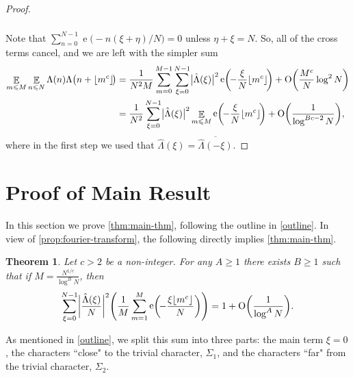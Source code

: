 \documentclass[letterpaper, 12pt]{article}
\theoremstyle{plain}
\newtheorem{Theorem}{Theorem}
\theoremstyle{definition}
\theoremstyle{plain}
\theoremstyle{plain}
\numberwithin{equation}{section}
\newcommand{\Oh}{{\rm O}}
\renewcommand{\leq}{\leqslant}
\renewcommand{\geq}{\geqslant}
\newcommand{\E}{\mathbb{E}}
\newcommand{\1}{\textbf{1}}
\DeclarePairedDelimiter\floor{\lfloor}{\rfloor}
\DeclareMathOperator{\e}{e}
\begin{document}
\begin{proof}
\begin{align*}
\begin{split}
        \end{split}
    \end{align*}
    Note that \(\sum_{n = 0}^{N - 1} \e\bigl(-n(\xi + \eta)/N \bigr) = 0\) unless \(\eta +\xi = N\). So, all of the cross terms cancel, and we are left with the simpler sum
    \begin{align*}
        \mathop{\E}_{m \leq M} \mathop{\E}_{n \leq N} \Lambda(n) \Lambda\bigl(n + \floor{m^c} \!\bigr)
        &= \frac{1}{N^2M} \sum_{m = 0}^{M - 1} \sum_{\xi = 0}^{N - 1} \bigl\lvert \hat{\Lambda}(\xi) \bigr\rvert^2 \e\biggl(\! -\frac{\xi}{N} \floor{m^c} \!\biggr) + \Oh \biggl(\frac{M^c}{N}\log^2{N} \biggr)\\
        &=\frac{1}{N^2} \sum_{\xi = 0}^{N - 1} \bigl\lvert \hat{\Lambda}(\xi) \bigr\rvert^2 \mathop{\E}_{m \leq M} \e\biggl(\! -\frac{\xi}{N} \floor{m^c} \!\biggr) + \Oh \biggl(\frac{1}{\log^{Bc-2}{N}}\biggr),
    \end{align*} where in the first step we used that $\hat{\Lambda}(\xi) = \overline{\hat{\Lambda}(-\xi)}$.
\end{proof}

\section{Proof of Main Result}

In this section we prove \cref{thm:main-thm}, following the outline in \cref{outline}. In view of \cref{prop:fourier-transform}, the following directly implies \cref{thm:main-thm}.

\begin{Theorem}\label{thm:c-greater-than-2}
    Let $c > 2$ be a non-integer.
    For any $A \geq 1$ there exists $B \geq 1$ such that if $M = \frac{N^{1/c}}{\log^{B} N}$, then
    \[
         \sum_{\xi = 0}^{N - 1} \biggl\lvert \frac{\hat{\Lambda}(\xi)}{N} \biggr\rvert^2 \Biggl(\frac{1}{M} \sum_{m = 1}^M \e\biggl(\! -\frac{\xi \floor{m^c}}{N} \biggr)\Biggr) 
         = 1 + \Oh\biggl(\frac{1}{\log^A N} \biggr).
    \]
\end{Theorem}

As mentioned in \cref{outline}, we split this sum into three parts: the main term $\xi = 0$, the characters ``close" to the trivial character, $\Sigma_1$, and the characters ``far" from the trivial character, $\Sigma_2$.
\end{document}
